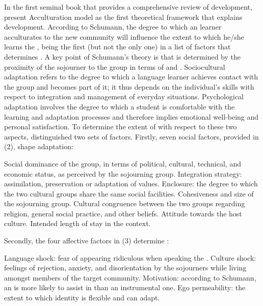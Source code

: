 \documentclass[output=paper]{langsci/langscibook}
\begin{document}
In the first seminal book that provides a comprehensive review of   development, \citet{KasperRose2002} present  Acculturation model as the first theoretical framework that explains  development. According to Schumann, the degree to which an  learner acculturates to the new  community will influence the extent to which he/she learns the ,  being the first (but not the only one) in a list of factors that determines  . A key point of Schumann’s theory is that  is determined by the proximity of the sojourner to the  group in terms of  and . Sociocultural adaptation refers to the degree to which a language learner achieves contact with the  group and becomes part of it; it thus depends on the individual’s skills with respect to integration and management of everyday situations. Psychological adaptation involves the degree to which a student is comfortable with the learning and adaptation processes and therefore implies emotional well-being and personal satisfaction. To determine the extent of  with respect to these two aspects, \citet{Schumann1986} distinguished two sets of factors. Firstly, seven social factors, provided in (2), shape  adaptation: 

\ea%
\ea Social dominance of the  group, in terms of political, cultural, technical, and economic status, as perceived by the sojourning group.
\ex Integration strategy: assimilation, preservation or adaptation of  values.
\ex Enclosure: the degree to which the two cultural groups share the same social facilities.
\ex Cohesiveness and size of the sojourning group.
\ex Cultural congruence between the two groups regarding religion, general social practice, and other beliefs.
\ex Attitude towards the host culture.
\ex Intended length of stay in the  context.
\z
\z

Secondly, the four affective factors in (3) determine : 

\ea%
\ea  Language shock: fear of appearing ridiculous when speaking the .
\ex Culture shock: feelings of rejection, anxiety, and disorientation by the sojourners while living amongst members of the target community.
\ex Motivation: according to Schumann, an  is more likely to assist in  than an instrumental one. 
\ex Ego permeability: the extent to which identity is flexible and can adapt.
\z
\z
\end{document}
